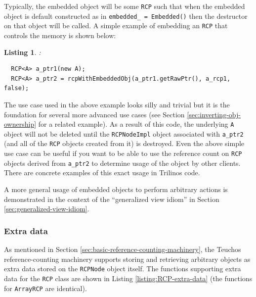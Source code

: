 \documentclass[pdf,ps2pdf,11pt]{SANDreport}
\newtheorem{listing}{Listing}
\begin{document}
Typically, the embedded object will be some {}\texttt{RCP} such that
when the embedded object is default constructed as in
{}\texttt{embedded\_ = Embedded()} then the destructor on that object
will be called.  A simple example of embedding an {}\texttt{RCP} that
controls the memory is shown below:

\begin{listing}: \\
{\small\begin{verbatim}
  RCP<A> a_ptr1(new A);
  RCP<A> a_ptr2 = rcpWithEmbeddedObj(a_ptr1.getRawPtr(), a_rcp1, false);
\end{verbatim}}
\end{listing}

The use case used in the above example looks silly and trivial but it
is the foundation for several more advanced use cases (see Section
{}\ref{sec:inverting-obj-ownership} for a related example).  As a
result of this code, the underlying {}\texttt{A} object will not be
deleted until the {}\texttt{RCPNodeImpl} object associated with
{}\texttt{a\_ptr2} (and all of the {}\texttt{RCP} objects created from
it) is destroyed.  Even the above simple use case can be useful if you
want to be able to use the reference count on {}\texttt{RCP} objects
derived from {}\texttt{a\_ptr2} to determine usage of the object by
other clients.  There are concrete examples of this exact usage in
Trilinos code.

A more general usage of embedded objects to perform arbitrary actions
is demonstrated in the context of the ``generalized view idiom'' in
Section {}\ref{sec:generalized-view-idiom}.


%
{}\subsubsection{Extra data}
\label{sec:extra-data}
%

As mentioned in Section
{}\ref{sec:basic-reference-counting-machinery}, the Teuchos
reference-counting machinery supports storing and retrieving arbitrary
objects as extra data stored on the {}\texttt{RCPNode} object itself.
The functions supporting extra data for the {}\texttt{RCP} class are
shown in Listing {}\ref{listing:RCP-extra-data} (the functions for
{}\texttt{ArrayRCP} are identical).
\end{document}
